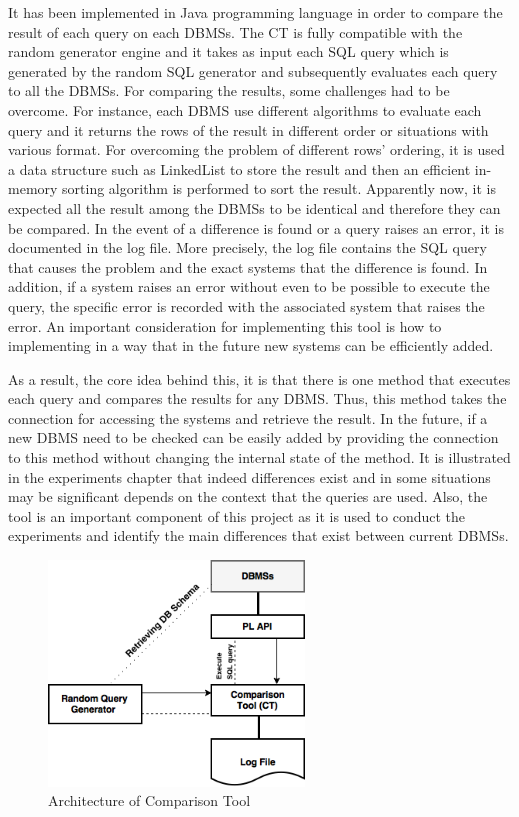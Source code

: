 It has been implemented in Java programming language in order to compare the result of each query on each DBMSs. The CT is fully compatible with the random generator engine and it takes as input each SQL query which is generated by the random SQL generator and subsequently evaluates each query to all the DBMSs. For comparing the results, some challenges had to be overcome. For instance, each DBMS use different algorithms to evaluate each query and it returns the rows of the result in different order or situations with various format. For overcoming  the problem of different rows’ ordering, it is used a data structure such as LinkedList to store the result and then an efficient in-memory sorting algorithm is performed to sort the result. Apparently now, it is expected all the result among the DBMSs to be identical and therefore they can be compared. In the event of a difference is found or a query raises an error, it is documented in the log file. More precisely, the log file contains the SQL query that causes the problem and the exact systems that the difference is found. In addition, if a system raises an error without even to be possible to execute the query, the specific error is recorded with the associated system that raises the error. An important consideration for implementing this tool is how to implementing in a way that in the future new systems can be efficiently added. 

As a result, the core idea behind this, it is that there is one method that executes each query and compares the results for any DBMS. Thus, this method takes the connection for accessing the systems and retrieve the result. In the future, if a new DBMS need to be checked can be easily added by providing the connection to this method without changing the internal state of the method.  
 It is illustrated in the experiments chapter  that indeed differences exist and in some situations may be significant depends on the context that the queries are used. Also, the tool is an important component of this project as it is used to conduct the experiments and identify the main differences that exist between current DBMSs. 

 \begin{figure} 
      \centering
      \includegraphics[width=\textwidth,height=6cm]{Images/Chapter4/3-ComparisonTool}
      \caption{Architecture of Comparison Tool}
      \label{fig:counting-methods}
  \end{figure}

